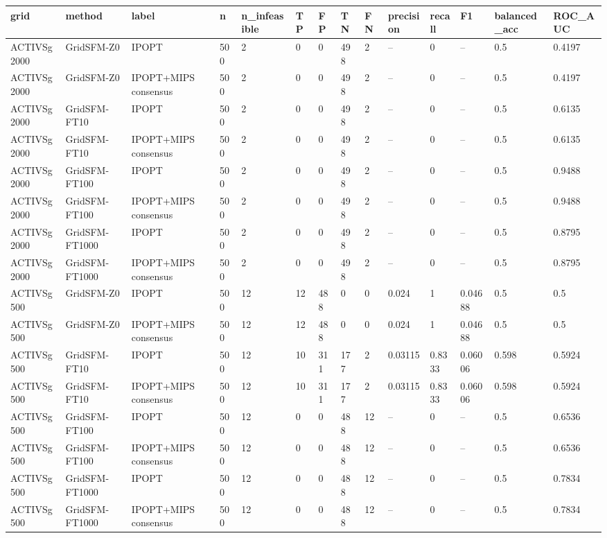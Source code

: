 \begin{tabular}{llllllllllllll}
\hline
grid & method & label & n & n\_infeasible & TP & FP & TN & FN & precision & recall & F1 & balanced\_acc & ROC\_AUC \\
\hline
ACTIVSg2000 & GridSFM-Z0 & IPOPT & 500 & 2 & 0 & 0 & 498 & 2 & -- & 0 & -- & 0.5 & 0.4197 \\
ACTIVSg2000 & GridSFM-Z0 & IPOPT+MIPS consensus & 500 & 2 & 0 & 0 & 498 & 2 & -- & 0 & -- & 0.5 & 0.4197 \\
ACTIVSg2000 & GridSFM-FT10 & IPOPT & 500 & 2 & 0 & 0 & 498 & 2 & -- & 0 & -- & 0.5 & 0.6135 \\
ACTIVSg2000 & GridSFM-FT10 & IPOPT+MIPS consensus & 500 & 2 & 0 & 0 & 498 & 2 & -- & 0 & -- & 0.5 & 0.6135 \\
ACTIVSg2000 & GridSFM-FT100 & IPOPT & 500 & 2 & 0 & 0 & 498 & 2 & -- & 0 & -- & 0.5 & 0.9488 \\
ACTIVSg2000 & GridSFM-FT100 & IPOPT+MIPS consensus & 500 & 2 & 0 & 0 & 498 & 2 & -- & 0 & -- & 0.5 & 0.9488 \\
ACTIVSg2000 & GridSFM-FT1000 & IPOPT & 500 & 2 & 0 & 0 & 498 & 2 & -- & 0 & -- & 0.5 & 0.8795 \\
ACTIVSg2000 & GridSFM-FT1000 & IPOPT+MIPS consensus & 500 & 2 & 0 & 0 & 498 & 2 & -- & 0 & -- & 0.5 & 0.8795 \\
ACTIVSg500 & GridSFM-Z0 & IPOPT & 500 & 12 & 12 & 488 & 0 & 0 & 0.024 & 1 & 0.04688 & 0.5 & 0.5 \\
ACTIVSg500 & GridSFM-Z0 & IPOPT+MIPS consensus & 500 & 12 & 12 & 488 & 0 & 0 & 0.024 & 1 & 0.04688 & 0.5 & 0.5 \\
ACTIVSg500 & GridSFM-FT10 & IPOPT & 500 & 12 & 10 & 311 & 177 & 2 & 0.03115 & 0.8333 & 0.06006 & 0.598 & 0.5924 \\
ACTIVSg500 & GridSFM-FT10 & IPOPT+MIPS consensus & 500 & 12 & 10 & 311 & 177 & 2 & 0.03115 & 0.8333 & 0.06006 & 0.598 & 0.5924 \\
ACTIVSg500 & GridSFM-FT100 & IPOPT & 500 & 12 & 0 & 0 & 488 & 12 & -- & 0 & -- & 0.5 & 0.6536 \\
ACTIVSg500 & GridSFM-FT100 & IPOPT+MIPS consensus & 500 & 12 & 0 & 0 & 488 & 12 & -- & 0 & -- & 0.5 & 0.6536 \\
ACTIVSg500 & GridSFM-FT1000 & IPOPT & 500 & 12 & 0 & 0 & 488 & 12 & -- & 0 & -- & 0.5 & 0.7834 \\
ACTIVSg500 & GridSFM-FT1000 & IPOPT+MIPS consensus & 500 & 12 & 0 & 0 & 488 & 12 & -- & 0 & -- & 0.5 & 0.7834 \\
\hline
\end{tabular}
